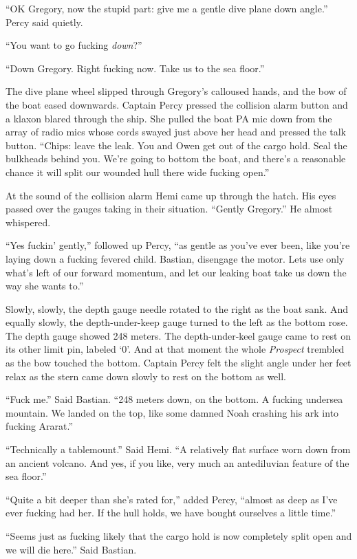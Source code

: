 \documentclass[]{scrbook}
\begin{document}
``OK Gregory, now the stupid part: give me a gentle dive plane down
angle.'' Percy said quietly.

``You want to go fucking \emph{down}?''

``Down Gregory. Right fucking now. Take us to the sea floor.''

The dive plane wheel slipped through Gregory's calloused hands, and the
bow of the boat eased downwards. Captain Percy pressed the collision
alarm button and a klaxon blared through the ship. She pulled the boat
PA mic down from the array of radio mics whose cords swayed just above
her head and pressed the talk button. ``Chips: leave the leak. You and
Owen get out of the cargo hold. Seal the bulkheads behind you. We're
going to bottom the boat, and there's a reasonable chance it will split
our wounded hull there wide fucking open.''

At the sound of the collision alarm Hemi came up through the hatch. His
eyes passed over the gauges taking in their situation. ``Gently
Gregory.'' He almost whispered.

``Yes fuckin' gently,'' followed up Percy, ``as gentle as you've ever
been, like you're laying down a fucking fevered child. Bastian,
disengage the motor. Lets use only what's left of our forward momentum,
and let our leaking boat take us down the way she wants to.''

Slowly, slowly, the depth gauge needle rotated to the right as the boat
sank. And equally slowly, the depth-under-keep gauge turned to the left
as the bottom rose. The depth gauge showed 248 meters. The
depth-under-keel gauge came to rest on its other limit pin, labeled `0'.
And at that moment the whole \emph{Prospect} trembled as the bow touched
the bottom. Captain Percy felt the slight angle under her feet relax as
the stern came down slowly to rest on the bottom as well.

``Fuck me.'' Said Bastian. ``248 meters down, on the bottom. A fucking
undersea mountain. We landed on the top, like some damned Noah crashing
his ark into fucking Ararat.''

``Technically a tablemount.'' Said Hemi. ``A relatively flat surface
worn down from an ancient volcano. And yes, if you like, very much an
antediluvian feature of the sea floor.''

``Quite a bit deeper than she's rated for,'' added Percy, ``almost as
deep as I've ever fucking had her. If the hull holds, we have bought
ourselves a little time.''

``Seems just as fucking likely that the cargo hold is now completely
split open and we will die here.'' Said Bastian.
\end{document}
